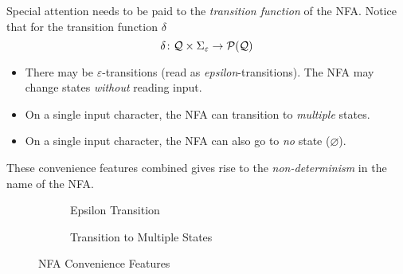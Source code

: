 \begin{remark}
    Special attention needs to be paid to the \textit{transition function} of the NFA. Notice that for the transition function $\delta$
    \begin{equation}
        \delta \colon \mathcal{Q} \times \Sigma_{\varepsilon} \to \mathcal{P}(\mathcal{Q})
    \end{equation}

    \begin{itemize}
        \item There may be $\varepsilon$-transitions (read as \textit{epsilon}-transitions). The NFA may change states \textit{without} reading input.
        \item On a single input character, the NFA can transition to \textit{multiple} states.
        \item On a single input character, the NFA can also go to \textit{no} state ($\varnothing$).
    \end{itemize}
    
    These convenience features combined gives rise to the \textit{non-determinism} in the name of the NFA.
    
    \begin{figure}[H]
        \centering
        \begin{subfigure}{0.45\textwidth}
            \centering
            \caption{Epsilon Transition}
        \end{subfigure}
        \begin{subfigure}{0.45\textwidth}
            \centering
            \caption{Transition to Multiple States}
        \end{subfigure}
        \caption{NFA Convenience Features}
        \label{fig:nfa-notation}
    \end{figure}
\end{remark}

